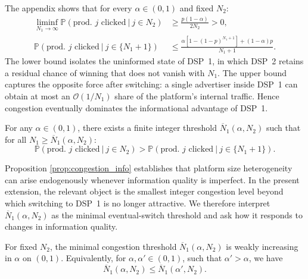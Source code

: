 \noindent The appendix shows that for every $\alpha \in (0,1)$ and fixed $N_2$:
\begin{align*}
    \liminf_{N_1 \to \infty} \mathbb{P}(\text{prod. } j \text{ clicked} \ | \ j \in N_2 ) & \geq \frac{p(1-\alpha)}{2N_2} > 0, \\[5pt]
    \mathbb{P}(\text{prod. } j \text{ clicked} \ | \ j \in \{N_{1}+1\} ) & \leq \frac{\alpha\left[1-(1-p)^{N_1+1}\right] + (1-\alpha)p}{N_1+1}.
\end{align*}
The lower bound isolates the uninformed state of DSP~1, in which DSP~2 retains a residual chance of winning that does not vanish with $N_1$. The upper bound captures the opposite force after switching: a single advertiser inside DSP~1 can obtain at most an $\mathcal{O}(1/N_1)$ share of the platform's internal traffic. Hence congestion eventually dominates the informational advantage of DSP~1.

\begin{prop}\label{prop:congestion_info}
For any $\alpha \in (0,1)$, there exists a finite integer threshold $\overline{N}_1(\alpha, N_2)$ such that for all $N_1 \geq \overline{N}_1(\alpha, N_2)$:
\begin{equation*}
    \mathbb{P}(\text{prod. } j \text{ clicked} \ | \ j \in N_2 ) > \mathbb{P}(\text{prod. } j \text{ clicked} \ | \ j \in \{N_{1}+1\} ).
\end{equation*}
\end{prop}

\noindent Proposition \ref{prop:congestion_info} establishes that platform size heterogeneity can arise endogenously whenever information quality is imperfect. In the present extension, the relevant object is the smallest integer congestion level beyond which switching to DSP~1 is no longer attractive. We therefore interpret $\overline{N}_1(\alpha, N_2)$ as the minimal eventual-switch threshold and ask how it responds to changes in information quality.

\begin{prop}\label{prop:threshold_monotone}
For fixed $N_2$, the minimal congestion threshold $\overline{N}_1(\alpha, N_2)$ is weakly increasing in $\alpha$ on $(0,1)$. Equivalently, for $\alpha, \alpha ' \in (0,1)$, such that $\alpha'> \alpha$, we have
\begin{equation*}
    \overline{N}_1(\alpha, N_2) \leq \overline{N}_1(\alpha', N_2).
\end{equation*}
\end{prop}

